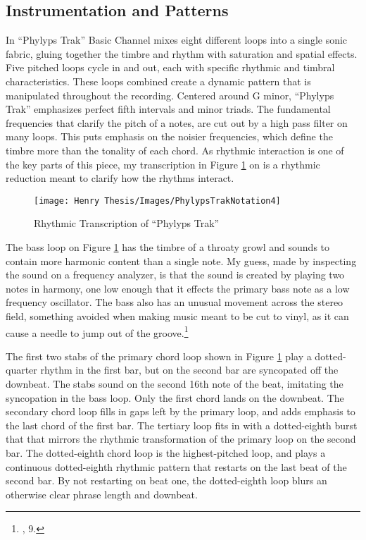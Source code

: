 \documentclass[12pt,twoside]{reedthesis}
\begin{document}
\subsection{Instrumentation and Patterns}

In ``Phylyps Trak'' Basic Channel mixes eight different loops into a single sonic fabric, gluing together the timbre and rhythm with saturation and spatial effects. Five pitched loops cycle in and out, each with specific rhythmic and timbral characteristics. These loops combined create a dynamic pattern that is manipulated throughout the recording. Centered around G minor, ``Phylyps Trak'' emphasizes perfect fifth intervals and minor triads. The fundamental frequencies that clarify the pitch of a notes, are cut out by a high pass filter on many loops. This puts emphasis on the noisier frequencies, which define the timbre more than the tonality of each chord. As rhythmic interaction is one of the key parts of this piece, my transcription in Figure \ref{fig:phylyprytm} on \pageref{fig:phylyprytm} is a rhythmic reduction meant to clarify how the rhythms interact.

\begin{figure}
\begin{centering} 
\texttt{[image: Henry Thesis/Images/PhylypsTrakNotation4]}
\caption{Rhythmic Transcription of ``Phylyps Trak''}
\label{fig:phylyprytm}
\end{centering} 
\end{figure}

The bass loop on Figure \ref{fig:phylyprytm} has the timbre of a throaty growl and sounds to contain more harmonic content than a single note. My guess, made by inspecting the sound on a frequency analyzer, is that the sound is created by playing two notes in harmony, one low enough that it effects the primary bass note as a low frequency oscillator. The bass also has an unusual movement across the stereo field, something avoided when making music meant to be cut to vinyl, as it can cause a needle to jump out of the groove.\footnote{\cite{hooseTurningTablesEngineering2018}, 9.}

The first two stabs of the primary chord loop shown in Figure \ref{fig:phylyprytm} play a dotted-quarter rhythm in the first bar, but on the second bar are syncopated off the downbeat. The stabs sound on the second 16th note of the beat, imitating the syncopation in the bass loop. Only the first chord lands on the downbeat. The secondary chord loop fills in gaps left by the primary loop, and adds emphasis to the last chord of the first bar. The tertiary loop fits in with a dotted-eighth burst that that mirrors the rhythmic transformation of the primary loop on the second bar. The dotted-eighth chord loop is the highest-pitched loop, and plays a continuous dotted-eighth rhythmic pattern that restarts on the last beat of the second bar. By not restarting on beat one, the dotted-eighth loop blurs an otherwise clear phrase length and downbeat.
\end{document}
